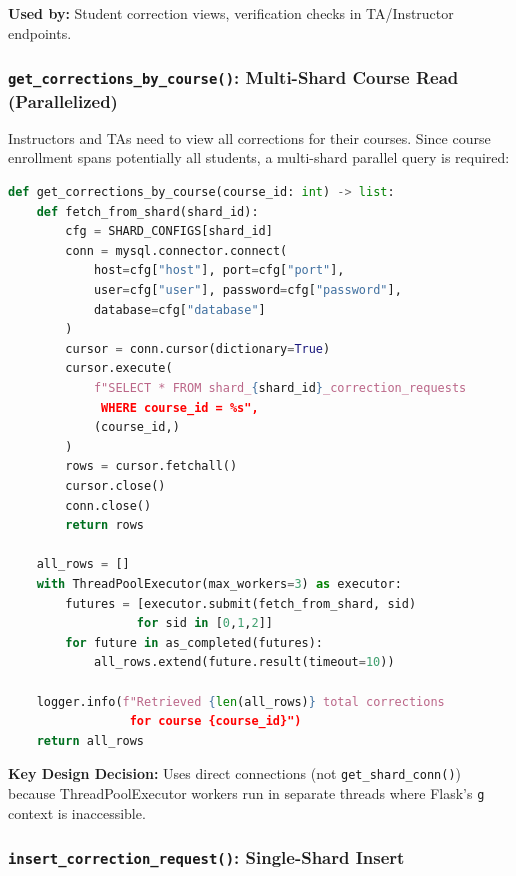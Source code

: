 \documentclass[conference]{IEEEtran}
\begin{document}
\textbf{Used by:} Student correction views, verification checks in TA/Instructor endpoints.

\subsubsection{\texttt{get\_corrections\_by\_course()}: Multi-Shard Course Read (Parallelized)}

Instructors and TAs need to view all corrections for their courses. Since course enrollment spans potentially all students, a multi-shard parallel query is required:

\begin{lstlisting}[language=Python]
def get_corrections_by_course(course_id: int) -> list:
    def fetch_from_shard(shard_id):
        cfg = SHARD_CONFIGS[shard_id]
        conn = mysql.connector.connect(
            host=cfg["host"], port=cfg["port"],
            user=cfg["user"], password=cfg["password"],
            database=cfg["database"]
        )
        cursor = conn.cursor(dictionary=True)
        cursor.execute(
            f"SELECT * FROM shard_{shard_id}_correction_requests 
             WHERE course_id = %s",
            (course_id,)
        )
        rows = cursor.fetchall()
        cursor.close()
        conn.close()
        return rows
    
    all_rows = []
    with ThreadPoolExecutor(max_workers=3) as executor:
        futures = [executor.submit(fetch_from_shard, sid) 
                  for sid in [0,1,2]]
        for future in as_completed(futures):
            all_rows.extend(future.result(timeout=10))
    
    logger.info(f"Retrieved {len(all_rows)} total corrections 
                 for course {course_id}")
    return all_rows
\end{lstlisting}

\textbf{Key Design Decision:} Uses direct connections (not \texttt{get\_shard\_conn()}) because ThreadPoolExecutor workers run in separate threads where Flask's \texttt{g} context is inaccessible.

\subsubsection{\texttt{insert\_correction\_request()}: Single-Shard Insert}
\end{document}
